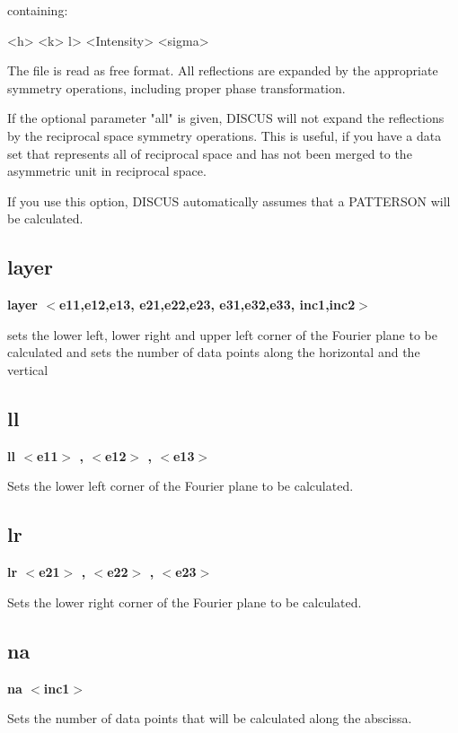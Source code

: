 containing: 
\par
\begin{MacVerbatim}
  <h> <k> l> <Intensity> <sigma>
\end{MacVerbatim}
The file is read as free format. All reflections are expanded by the 
appropriate symmetry operations, including proper phase transformation. 
\par
If the optional parameter "all" is given, DISCUS will not expand 
the reflections by the reciprocal space symmetry operations. This is 
useful, if you have a data set that represents all of reciprocal 
space and has not been merged to the asymmetric unit in reciprocal space. 
\par
If you use this option, DISCUS automatically assumes that a 
PATTERSON will be calculated. 
\subsection*{layer}
{\bf layer $ <$e11,e12,e13, e21,e22,e23, e31,e32,e33, inc1,inc2$> $ \par }
\par
\vspace{3pt}
sets the lower left, lower right and upper left corner of the 
Fourier plane to be calculated and sets the number of data 
points along the horizontal and the vertical 
\subsection*{ll}
{\bf ll $ <$e11$> $ , $ <$e12$> $ , $ <$e13$> $ \par }
\par
\vspace{3pt}
Sets the lower left corner of the Fourier plane to be calculated. 
\subsection*{lr}
{\bf lr $ <$e21$> $ , $ <$e22$> $ , $ <$e23$> $ \par }
\par
\vspace{3pt}
Sets the lower right corner of the Fourier plane to be calculated. 
\subsection*{na}
{\bf na $ <$inc1$> $ \par }
\par
\vspace{3pt}
Sets the number of data points that will be calculated along the 
abscissa. 
